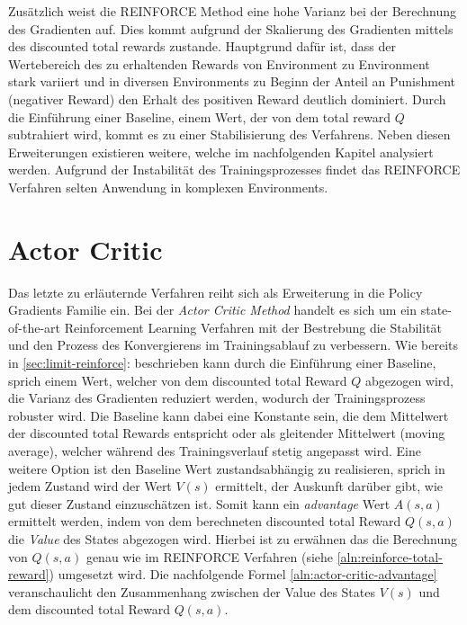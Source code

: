 \documentclass[11pt]{scrartcl}
\begin{document}
Zusätzlich weist die REINFORCE Method eine hohe Varianz bei der Berechnung des Gradienten auf.
Dies kommt aufgrund der Skalierung des Gradienten mittels des discounted total rewards zustande.
Hauptgrund dafür ist, dass der Wertebereich des zu erhaltenden Rewards von Environment zu Environment
stark variiert und in diversen Environments zu Beginn der Anteil an Punishment (negativer Reward) den
Erhalt des positiven Reward deutlich dominiert. Durch die Einführung einer Baseline, einem Wert, der
von dem total reward $Q$ subtrahiert wird, kommt es zu einer Stabilisierung des Verfahrens. Neben
diesen Erweiterungen existieren weitere, welche im nachfolgenden Kapitel analysiert werden. Aufgrund
der Instabilität des Trainingsprozesses findet das REINFORCE Verfahren selten Anwendung in komplexen
Environments.   
\newpage


\section{Actor Critic}
Das letzte zu erläuternde Verfahren reiht sich als Erweiterung in die Policy Gradients Familie ein.
Bei der \textit{Actor Critic Method} handelt es sich um ein state-of-the-art Reinforcement Learning
Verfahren mit der Bestrebung die Stabilität und den Prozess des Konvergierens im Trainingsablauf
zu verbessern. Wie bereits in \autoref{sec:limit-reinforce}:  beschrieben
kann durch die Einführung einer Baseline, sprich einem Wert, welcher von dem discounted total Reward $Q$
abgezogen wird, die Varianz des Gradienten reduziert werden, wodurch der Trainingsprozess robuster wird.
Die Baseline kann dabei eine Konstante sein, die dem Mittelwert der discounted total Rewards
entspricht oder als gleitender Mittelwert (moving average), welcher während des Trainingsverlauf stetig
angepasst wird. Eine weitere Option ist den Baseline Wert zustandsabhängig zu realisieren, sprich in
jedem Zustand wird der Wert $V(s)$ ermittelt, der Auskunft darüber gibt, wie gut dieser Zustand
einzuschätzen ist. Somit kann ein \textit{advantage} Wert $A(s,a)$ ermittelt werden, indem von dem 
berechneten discounted total Reward $Q(s,a)$ die \textit{Value} des States abgezogen wird. Hierbei ist
zu erwähnen das die Berechnung von $Q(s,a)$ genau wie im REINFORCE Verfahren (siehe 
\autoref{aln:reinforce-total-reward}) umgesetzt wird. Die nachfolgende Formel 
\ref{aln:actor-critic-advantage} veranschaulicht den Zusammenhang zwischen der Value des States $V(s)$
und dem discounted total Reward $Q(s,a)$.
\end{document}
